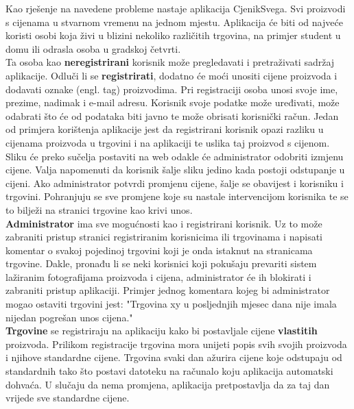		Kao rješenje na navedene probleme nastaje aplikacija CjenikSvega. Svi proizvodi s cijenama u stvarnom vremenu na jednom mjestu. Aplikacija će biti od najveće koristi osobi koja živi u blizini nekoliko različitih trgovina, na primjer student u domu ili odrasla osoba u gradskoj četvrti.\\
		
		Ta osoba kao \textbf{neregistrirani} korisnik može pregledavati i pretraživati sadržaj aplikacije. Odluči li se \textbf{registrirati}, dodatno će moći unositi cijene proizvoda i dodavati oznake (engl. tag) proizvodima. Pri registraciji osoba unosi svoje ime, prezime, nadimak i e-mail adresu. Korisnik svoje podatke može uređivati, može odabrati što će od podataka biti javno te može obrisati korisnički račun. Jedan od primjera korištenja aplikacije jest da registrirani korisnik opazi razliku u cijenama proizvoda u trgovini i na aplikaciji te uslika taj proizvod s cijenom. Sliku će preko sučelja postaviti na web odakle će administrator odobriti izmjenu cijene. Valja napomenuti da korisnik šalje sliku jedino kada postoji odstupanje u cijeni. Ako administrator potvrdi promjenu cijene, šalje se obavijest i korisniku i trgovini. Pohranjuju se sve promjene koje su nastale intervencijom korisnika te se to bilježi na stranici trgovine kao krivi unos.\\
		
		\textbf{Administrator} ima sve mogućnosti kao i registrirani korisnik. Uz to može zabraniti pristup stranici registriranim korisnicima ili trgovinama i napisati komentar o svakoj pojedinoj trgovini koji je onda istaknut na stranicama trgovine. Dakle, 
pronađu li se neki korisnici koji pokušaju prevariti sistem lažiranim fotografijama proizvoda i cijena, administrator će ih blokirati i zabraniti pristup aplikaciji. Primjer jednog komentara kojeg bi administrator mogao ostaviti trgovini jest: "Trgovina xy u posljednjih mjesec dana nije imala nijedan pogrešan unos cijena."\\
		
		\textbf{Trgovine} se registriraju na aplikaciju kako bi postavljale cijene \textbf{vlastitih} proizvoda. Prilikom registracije trgovina mora unijeti popis svih svojih proizvoda i njihove standardne cijene. Trgovina svaki dan ažurira cijene koje odstupaju od standardnih tako što postavi datoteku na računalo koju aplikacija automatski dohvaća. U slučaju da nema promjena, aplikacija pretpostavlja da za taj dan vrijede sve standardne cijene.\\
		
